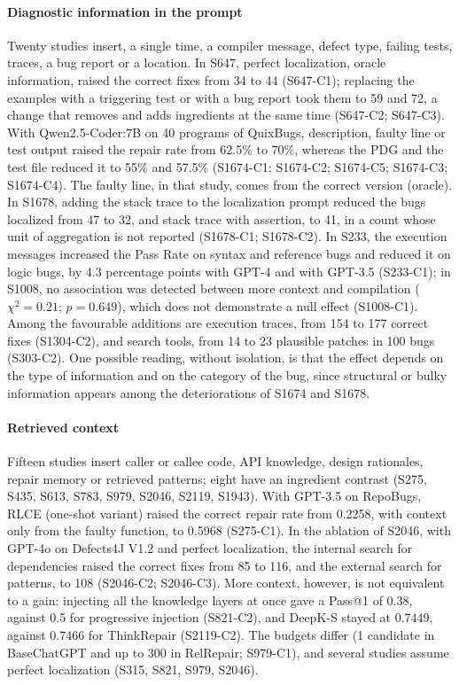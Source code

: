 \paragraph{Diagnostic information in the prompt}
Twenty studies insert, a single time, a compiler message, defect type, failing tests, traces, a bug report or a location.
In S647, perfect localization, oracle information, raised the correct fixes from 34 to 44 (S647-C1); replacing the examples with a triggering test or with a bug report took them to 59 and 72, a change that removes and adds ingredients at the same time (S647-C2; S647-C3).
With Qwen2.5-Coder:7B on 40 programs of QuixBugs, description, faulty line or test output raised the repair rate from 62.5\% to 70\%, whereas the PDG and the test file reduced it to 55\% and 57.5\% (S1674-C1; S1674-C2; S1674-C5; S1674-C3; S1674-C4).
The faulty line, in that study, comes from the correct version (oracle).
In S1678, adding the stack trace to the localization prompt reduced the bugs localized from 47 to 32, and stack trace with assertion, to 41, in a count whose unit of aggregation is not reported (S1678-C1; S1678-C2).
In S233, the execution messages increased the Pass Rate on syntax and reference bugs and reduced it on logic bugs, by 4.3 percentage points with GPT-4 and with GPT-3.5 (S233-C1); in S1008, no association was detected between more context and compilation ($\chi^2 = 0.21$; $p = 0.649$), which does not demonstrate a null effect (S1008-C1).
Among the favourable additions are execution traces, from 154 to 177 correct fixes (S1304-C2), and search tools, from 14 to 23 plausible patches in 100 bugs (S303-C2).
One possible reading, without isolation, is that the effect depends on the type of information and on the category of the bug, since structural or bulky information appears among the deteriorations of S1674 and S1678.

\paragraph{Retrieved context}
Fifteen studies insert caller or callee code, API knowledge, design rationales, repair memory or retrieved patterns; eight have an ingredient contrast (S275, S435, S613, S783, S979, S2046, S2119, S1943).
With GPT-3.5 on RepoBugs, RLCE (one-shot variant) raised the correct repair rate from 0.2258, with context only from the faulty function, to 0.5968 (S275-C1).
In the ablation of S2046, with GPT-4o on Defects4J V1.2 and perfect localization, the internal search for dependencies raised the correct fixes from 85 to 116, and the external search for patterns, to 108 (S2046-C2; S2046-C3).
More context, however, is not equivalent to a gain: injecting all the knowledge layers at once gave a Pass@1 of 0.38, against 0.5 for progressive injection (S821-C2), and DeepK-S stayed at 0.7449, against 0.7466 for ThinkRepair (S2119-C2).
The budgets differ (1 candidate in BaseChatGPT and up to 300 in RelRepair; S979-C1), and several studies assume perfect localization (S315, S821, S979, S2046).

